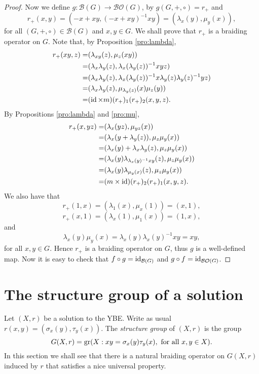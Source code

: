\begin{proof}
Now we define $g\colon \mathcal{B}(G)\rightarrow \mathcal{BO}(G)$, by $g(G,+,\circ)=r_+$ and
\[ r_+(x,y)=(-x+xy,(-x+xy)^{-1}xy)=(\lambda_x(y),\mu_y(x)),\]
for all $(G,+,\circ)\in\mathcal{B}(G)$ and $x,y\in G$. We shall prove that $r_+$ is a braiding operator on $G$. Note that, by Proposition \ref{pro:lambda}, 
\begin{align*}
    r_+(xy,z)=&(\lambda_{xy}(z),\mu_z(xy))\\
    =&(\lambda_x\lambda_y(z),\lambda_x(\lambda_y(z))^{-1}xyz)\\
    =&(\lambda_x\lambda_y(z),\lambda_x(\lambda_y(z))^{-1}x\lambda_y(z)\lambda_y(z)^{-1}yz)\\
    =&(\lambda_x\lambda_y(z),\mu_{\lambda_y(z)}(x)\mu_z(y))\\
    =&(\operatorname{id}\times m)(r_+)_1(r_+)_2(x,y,z).
\end{align*}
By Propositions \ref{pro:lambda} and \ref{pro:mu},
\begin{align*}
    r_+(x,yz)=&(\lambda_{x}(yz),\mu_{yz}(x))\\
    =&(\lambda_x(y+\lambda_y(z)),\mu_z\mu_y(x))\\
    =&(\lambda_x(y)+\lambda_x\lambda_y(z),\mu_z\mu_y(x))\\
    =&(\lambda_x(y)\lambda_{\lambda_x(y)^{-1}xy}(z),\mu_z\mu_y(x))\\
    =&(\lambda_x(y)\lambda_{\mu_y(x)}(z),\mu_z\mu_y(x))\\
    =&(m\times \operatorname{id})(r_+)_2(r_+)_1(x,y,z).
\end{align*}
We also have that
\[ r_+(1,x)=(\lambda_1(x),\mu_x(1))=(x,1),\]
\[ r_+(x,1)=(\lambda_x(1),\mu_1(x))=(1,x),\]
and
\[ \lambda_x(y)\mu_y(x)=\lambda_x(y)\lambda_x(y)^{-1}xy=xy,\]
for all $x,y\in G$. Hence $r_+$ is a braiding operator on $G$, thus $g$ is a well-defined map. Now it is easy to check that $f\circ g=\operatorname{id}_{\mathcal{B}(G)}$ and $g\circ f=\operatorname{id}_{\mathcal{BO}(G)}$.
\end{proof}

\section{The structure group of a solution}
Let $(X,r)$ be a solution to the YBE. Write as usual $r(x,y)=(\sigma_x(y),\tau_y(x))$. The {\em structure group} of $(X,r)$ is the group
\[ G(X,r)=\operatorname{gr}(X : xy=\sigma_x(y)\tau_y(x), \text{ for all }x,y\in X).\]
In this section we shall see that there is a natural braiding operator on $G(X,r)$ induced by $r$ that satisfies a nice universal property. 

